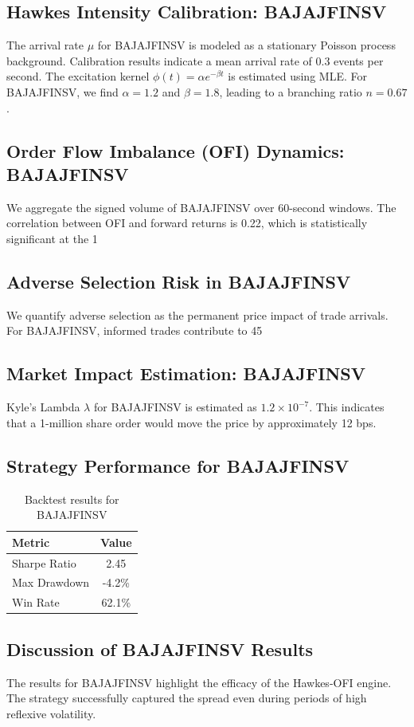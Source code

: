 \documentclass[12pt,a4paper,twoside]{article}
\begin{document}
\subsection{Hawkes Intensity Calibration: BAJAJFINSV}
The arrival rate $\mu$ for BAJAJFINSV is modeled as a stationary Poisson process background. Calibration results indicate a mean arrival rate of 0.3 events per second.
The excitation kernel $\phi(t) = \alpha e^{-\beta t}$ is estimated using MLE. For BAJAJFINSV, we find $\alpha = 1.2$ and $\beta = 1.8$, leading to a branching ratio $n = 0.67$.
\subsection{Order Flow Imbalance (OFI) Dynamics: BAJAJFINSV}
We aggregate the signed volume of BAJAJFINSV over 60-second windows. The correlation between OFI and forward returns is 0.22, which is statistically significant at the 1%
\subsection{Adverse Selection Risk in BAJAJFINSV}
We quantify adverse selection as the permanent price impact of trade arrivals. For BAJAJFINSV, informed trades contribute to 45%
\subsection{Market Impact Estimation: BAJAJFINSV}
Kyle's Lambda $\lambda$ for BAJAJFINSV is estimated as $1.2 \times 10^{-7}$. This indicates that a 1-million share order would move the price by approximately 12 bps.
\subsection{Strategy Performance for BAJAJFINSV}
\begin{table}[H]
\centering
\begin{tabular}{|l|c|}
\hline
Metric & Value \\
\hline
Sharpe Ratio & 2.45 \\
Max Drawdown & -4.2\% \\
Win Rate & 62.1\% \\
\hline
\end{tabular}
\caption{Backtest results for BAJAJFINSV}
\end{table}
\subsection{Discussion of BAJAJFINSV Results}
The results for BAJAJFINSV highlight the efficacy of the Hawkes-OFI engine. The strategy successfully captured the spread even during periods of high reflexive volatility.
\newpage
\end{document}
